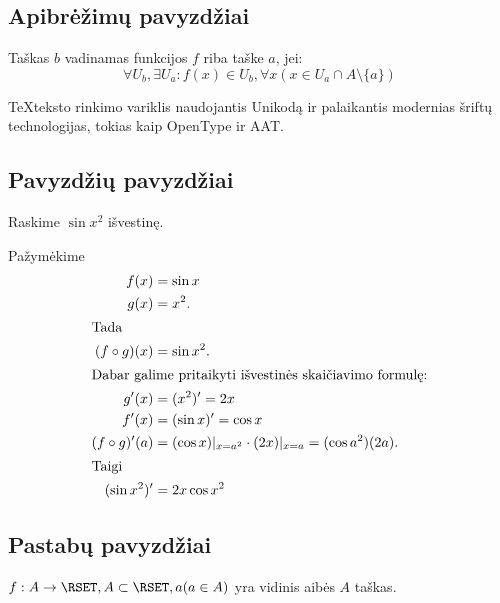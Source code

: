 \subsection{Apibrėžimų pavyzdžiai}

\begin{defn}
  \label{limfed}
  Taškas $b$ vadinamas funkcijos $f$ riba taške $a$, jei:
  \begin{equation*}
    \forall U_b, \exists U_a : f(x) \in U_b,
    \forall x (x \in U_a \cap A \setminus \{a\})
  \end{equation*}
\end{defn}

\begin{defn}[\XeTeX]
  \TeX teksto rinkimo variklis  naudojantis
  Unikodą ir palaikantis modernias šriftų technologijas, tokias kaip
  OpenType ir AAT.
\end{defn}

\subsection{Pavyzdžių pavyzdžiai}

\begin{exmp}
  Raskime $\sin x^{2}$ išvestinę.

  Pažymėkime
  \begin{align*}
    f(x) &= \sin x \\
    g(x) &= x^{2}. \\
    \intertext{Tada}
    (f \circ g)(x) &= \sin x^{2}.\\
    \intertext{Dabar galime pritaikyti išvestinės skaičiavimo formulę:}
    g'(x) &= (x^{2})' = 2x \\
    f'(x) &= (\sin x)' = \cos x \\
    (f \circ g)'(a) &= (\cos x)|_{x = a^{2}} \cdot (2x)|_{x=a}
      = (\cos a^2)(2a). \\
    \intertext{Taigi}
    (\sin x^{2})' &= 2x \cos x^{2}
  \end{align*}

\end{exmp}

\subsection{Pastabų pavyzdžiai}

\begin{note}
  $f : A \to \RSET, A \subset \RSET, a(a \in A)$ yra vidinis aibės
  $A$ taškas.
\end{note}

